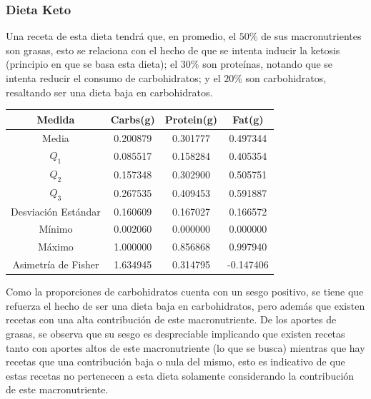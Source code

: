 \documentclass[12pt,a4paper]{article}
\begin{document}
    \subsubsection{Dieta Keto}
        Una receta de esta dieta tendrá que, en promedio, el $50\%$ de 
        sus macronutrientes son grasas, esto se relaciona con el hecho de 
        que se intenta inducir la ketosis (principio en que se basa esta         
        dieta); el $30\%$ son proteínas, notando que se intenta reducir 
        el consumo de carbohidratos; y el $20\%$ son carbohidratos, 
        resaltando ser una dieta baja en carbohidratos.
        \begin{center}
            \begin{tabular}{|c|ccc|}
                \hline
                Medida & Carbs(g) & Protein(g) & Fat(g) \\
                \hline
                Media               & 0.200879 & 0.301777 & 0.497344  \\
                $Q_1$               & 0.085517 & 0.158284 & 0.405354  \\
                $Q_2$               & 0.157348 & 0.302900 & 0.505751  \\
                $Q_3$               & 0.267535 & 0.409453 & 0.591887  \\
                Desviación Estándar & 0.160609 & 0.167027 & 0.166572  \\
                Mínimo              & 0.002060 & 0.000000 & 0.000000  \\
                Máximo              & 1.000000 & 0.856868 & 0.997940  \\
                Asimetría de Fisher & 1.634945 & 0.314795 & -0.147406 \\
                \hline
            \end{tabular}
        \end{center}
        Como la proporciones de carbohidratos cuenta con un sesgo positivo, se 
        tiene que refuerza el hecho de ser una dieta baja en carbohidratos, pero 
        además que existen recetas con una alta contribución de este macronutriente. 
        De los aportes de grasas, se observa que su sesgo es despreciable implicando 
        que existen recetas tanto con aportes altos de este macronutriente (lo que se 
        busca) mientras que hay recetas que una contribución baja o nula del mismo, esto 
        es indicativo de que estas recetas no pertenecen a esta dieta solamente considerando 
        la contribución de este macronutriente.
\end{document}
